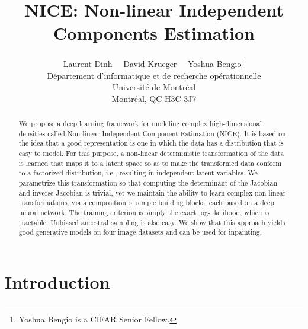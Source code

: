 \documentclass{article}
\title{NICE: Non-linear Independent Components Estimation}
\author{Laurent Dinh
\ \  David Krueger
\ \ Yoshua Bengio\thanks{Yoshua Bengio is a CIFAR Senior Fellow.}\\
D\'epartement d'informatique et de recherche op\'erationnelle\\
Universit\'e de Montr\'eal\\
Montr\'eal, QC H3C 3J7 \\
}
\date{}
\begin{document}
\maketitle

\begin{abstract}
We propose a deep learning framework for modeling complex high-dimensional
densities called Non-linear Independent Component Estimation (NICE).  It is based
on the idea that a good representation is one in which the data has a distribution
that is easy to model. For this purpose, a
non-linear deterministic transformation of the data is learned that maps it to a latent space
so as to make the transformed data conform to a factorized distribution,
i.e., resulting in independent latent variables. 
We parametrize this transformation so that computing the determinant of the Jacobian and inverse Jacobian is trivial, yet we maintain the
ability to learn complex non-linear transformations, via a composition of
simple building blocks, each based on a deep neural network. The training
criterion is simply the exact log-likelihood, which is tractable. Unbiased ancestral
sampling is also easy. We show that this approach yields good
generative models on four image datasets and can be used for inpainting.
\end{abstract}

\section{Introduction}
\end{document}
